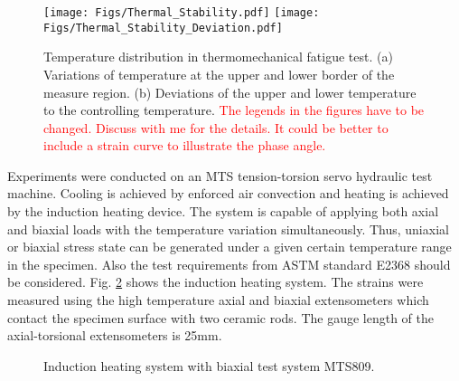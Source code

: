 \documentclass[preprint,5p,twocolumn,11pt,sort&compress]{elsarticle}
\newcommand{\marked}[1]{\textcolor{red}{#1}}
\begin{document}
\begin{figure}[!htp]
\texttt{[image: Figs/Thermal\_Stability.pdf]}
\texttt{[image: Figs/Thermal\_Stability\_Deviation.pdf]}
\caption{Temperature distribution in thermomechanical fatigue test. (a) Variations of temperature at the upper and lower border of the measure region. (b) Deviations of the upper and lower temperature to the controlling temperature. \marked{The legends in the figures have to be changed. Discuss with me for the details. It could be better to include a strain curve to illustrate the phase angle.}}
\label{Fig:Temp-Distr}
\end{figure}

Experiments were conducted on an MTS tension-torsion servo hydraulic test machine. Cooling is achieved by enforced air convection and heating is achieved by the induction heating device. The system is capable of applying both axial and biaxial loads with the temperature variation simultaneously. Thus, uniaxial or biaxial stress state can be generated under a given certain temperature range in the specimen. Also the test requirements from ASTM standard E2368 \cite{ASTM2014a} should be considered. Fig. \ref{Fig:Equipments} shows the induction heating system. The strains were measured using the high temperature axial and biaxial extensometers which contact the specimen surface with two ceramic rods. The gauge length of the axial-torsional extensometers is 25mm.

\begin{figure}[!htp]
\caption{Induction heating system with biaxial test system MTS809.}
\label{Fig:Equipments}
\end{figure}
\end{document}
